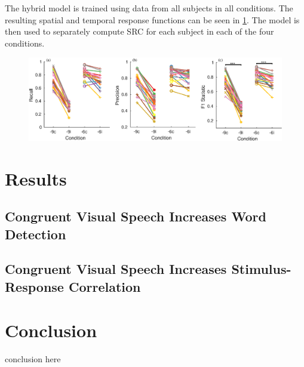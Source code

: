 \documentclass[10pt,letterpaper]{article}
\begin{document}
  The hybrid model is trained using data from all subjects in all conditions. 
  The resulting spatial and temporal response functions can be seen in 
  \ref{behavior}. The model is then used to separately compute SRC for each 
  subject in each of the four conditions.
  




\begin{figure}[]
  \begin{center}
    \includegraphics[width=\columnwidth]{Figure2}
  \end{center}
  \caption{}
  \label{behavior}
\end{figure}


\section{Results}

  \subsection{Congruent Visual Speech Increases Word Detection}

  \subsection{Congruent Visual Speech Increases Stimulus-Response Correlation}


\section{Conclusion}

conclusion here




\setlength{\bibleftmargin}{.125in}
\setlength{\bibindent}{-\bibleftmargin}


\end{document}
